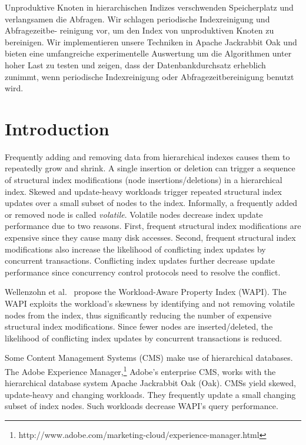 \documentclass[abstracton,12pt]{scrartcl}
\theoremstyle{definition}
\begin{document}
Unproduktive Knoten in hierarchischen Indizes verschwenden Speicherplatz und
verlangsamen die Abfragen. Wir schlagen periodische Indexreinigung
und Abfragezeitbe- reinigung vor, um den Index von unproduktiven Knoten zu
bereinigen. Wir implementieren
unsere Techniken in Apache Jackrabbit Oak und bieten eine umfangreiche
experimentelle Auswertung um die Algorithmen unter hoher Last zu testen und
zeigen, dass der Datenbankdurchsatz erheblich zunimmt, wenn periodische
Indexreinigung oder Abfragezeitbereinigung benutzt wird.

\newpage
\thispagestyle{empty}

\tableofcontents

\newpage
\thispagestyle{empty}

\listoffigures

\newpage

\newpage\null\thispagestyle{empty}\newpage

\section{Introduction}

Frequently adding and removing data from hierarchical indexes causes them to
repeatedly grow and shrink. A single insertion or deletion can trigger a
sequence of structural index modifications (node insertions/deletions) in a
hierarchical index. Skewed and update-heavy workloads trigger repeated
structural index updates over a small subset of nodes to the index.
Informally, a frequently added or removed node is called \textit{volatile}.
Volatile nodes decrease index update performance due to two reasons. First,
frequent structural index modifications are expensive since they cause many disk
accesses. Second, frequent structural index modifications also increase the
likelihood of conflicting index updates by concurrent transactions. Conflicting
index updates further decrease update performance since concurrency control
protocols need to resolve the conflict.

Wellenzohn et al.~\cite{KW17} propose the Workload-Aware Property Index (WAPI).
The WAPI exploits the workload's skewness by identifying and not removing
volatile nodes from the index, thus significantly reducing the number of
expensive structural index modifications. Since fewer nodes are
inserted/deleted, the likelihood of conflicting index updates by concurrent
transactions is reduced.

Some Content Management Systems (CMS) make use of hierarchical \cite{Hainaut2009-hierarchical} 
databases. The Adobe Experience
Manager,\footnote{http://www.adobe.com/marketing-cloud/experience-manager.html}
Adobe's enterprise CMS, works with the hierarchical database system Apache
Jackrabbit Oak (Oak). CMSs yield skewed, update-heavy and changing
workloads. They frequently update a small changing subset of index nodes. Such
workloads decrease WAPI's query performance.
\end{document}
